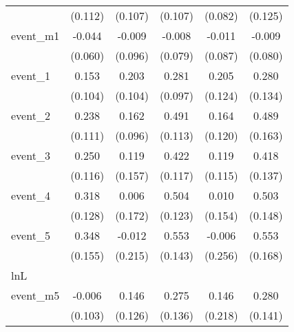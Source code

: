 {\begin{tabular}{l*{5}{c}}
            &     (0.112)         &     (0.107)         &     (0.107)         &     (0.082)         &     (0.125)         \\
[1em]
event\_m1    &      -0.044         &      -0.009         &      -0.008         &      -0.011         &      -0.009         \\
            &     (0.060)         &     (0.096)         &     (0.079)         &     (0.087)         &     (0.080)         \\
[1em]
event\_1     &       0.153         &       0.203         &       0.281\sym{**} &       0.205         &       0.280\sym{*}  \\
            &     (0.104)         &     (0.104)         &     (0.097)         &     (0.124)         &     (0.134)         \\
[1em]
event\_2     &       0.238\sym{*}  &       0.162         &       0.491\sym{***}&       0.164         &       0.489\sym{**} \\
            &     (0.111)         &     (0.096)         &     (0.113)         &     (0.120)         &     (0.163)         \\
[1em]
event\_3     &       0.250\sym{*}  &       0.119         &       0.422\sym{***}&       0.119         &       0.418\sym{**} \\
            &     (0.116)         &     (0.157)         &     (0.117)         &     (0.115)         &     (0.137)         \\
[1em]
event\_4     &       0.318\sym{*}  &       0.006         &       0.504\sym{***}&       0.010         &       0.503\sym{***}\\
            &     (0.128)         &     (0.172)         &     (0.123)         &     (0.154)         &     (0.148)         \\
[1em]
event\_5     &       0.348\sym{*}  &      -0.012         &       0.553\sym{***}&      -0.006         &       0.553\sym{***}\\
            &     (0.155)         &     (0.215)         &     (0.143)         &     (0.256)         &     (0.168)         \\
\hline
lnL         &                     &                     &                     &                     &                     \\
event\_m5    &      -0.006         &       0.146         &       0.275\sym{*}  &       0.146         &       0.280\sym{*}  \\
            &     (0.103)         &     (0.126)         &     (0.136)         &     (0.218)         &     (0.141)         \\

\end{tabular}}
